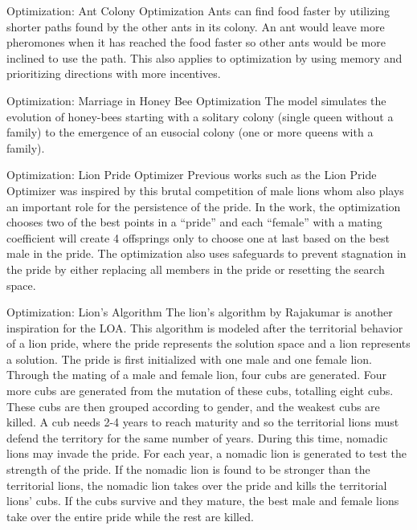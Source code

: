\documentclass{beamer}
\begin{document}
\begin{frame}{Optimization: Ant Colony Optimization}
Ants can find food faster by utilizing shorter paths found by the other ants in its colony. An ant would leave more pheromones when it has reached the food faster so other ants would be more inclined to use the path. This also applies to optimization by using memory and prioritizing directions with more incentives.
\end{frame}
\begin{frame}{Optimization: Marriage in Honey Bee Optimization}
The model simulates the evolution of honey-bees starting with a solitary colony (single queen without a family) to the emergence of an eusocial colony (one or more queens with a family).
\end{frame}
\begin{frame}{Optimization: Lion Pride Optimizer}
Previous works such as the Lion Pride Optimizer was inspired by this brutal competition of male lions whom also plays an important role for the persistence of the pride. In the work, the optimization chooses two of the best points in a ``pride'' and each ``female'' with a mating coefficient will create 4 offsprings only to choose one at last based on the best male in the pride. The optimization also uses safeguards to prevent stagnation in the pride by either replacing all members in the pride or resetting the search space.
\end{frame}
\begin{frame}{Optimization: Lion's Algorithm}
The lion's algorithm by Rajakumar \cite{rajakumar_2012} is another inspiration for the LOA. This algorithm is modeled after the territorial behavior of a lion pride, where the pride represents the solution space and a lion represents a solution. The pride is first initialized with one male and one female lion. Through the mating of a male and female lion, four cubs are generated. Four more cubs are generated from the mutation of these cubs, totalling eight cubs. These cubs are then grouped according to gender, and the weakest cubs are killed. A cub needs 2-4 years to reach maturity and so the territorial lions must defend the territory for the same number of years. During this time, nomadic lions may invade the pride. For each year, a nomadic lion is generated to test the strength of the pride. If the nomadic lion is found to be stronger than the territorial lions, the nomadic lion takes over the pride and kills the territorial lions' cubs. If the cubs survive and they mature, the best male and female lions take over the entire pride while the rest are killed.
\end{frame}
\end{document}

